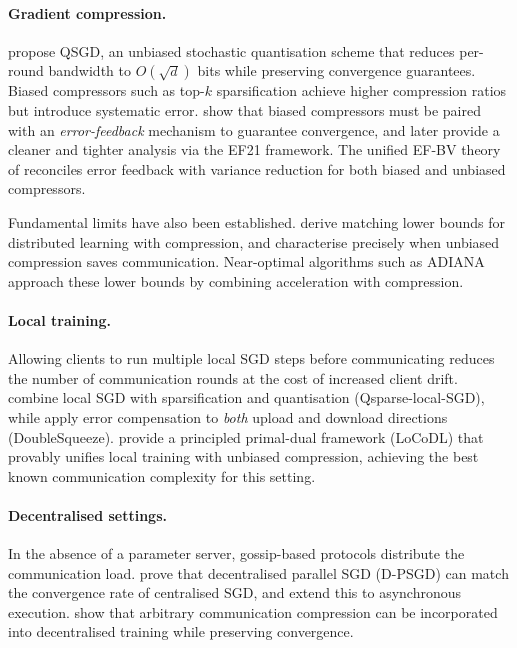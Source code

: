 \paragraph{Gradient compression.}
\citet{alistarh2017qsgd} propose QSGD, an unbiased stochastic
quantisation scheme that reduces per-round bandwidth to
$O(\sqrt{d})$ bits while preserving convergence guarantees.
Biased compressors such as top-$k$ sparsification achieve higher
compression ratios but introduce systematic error.
\citet{karimireddy2019error} show that biased compressors must be
paired with an \emph{error-feedback} mechanism to guarantee
convergence, and \citet{richtarik2021ef21} later provide a cleaner
and tighter analysis via the EF21 framework.  The unified EF-BV
theory of \citet{condat2022efbv} reconciles error feedback with
variance reduction for both biased and unbiased compressors.

Fundamental limits have also been established.
\citet{huang2022lower} derive matching lower bounds for distributed
learning with compression, and \citet{he2023unbiased} characterise
precisely when unbiased compression saves communication.
Near-optimal algorithms such as ADIANA
\citep{li2020acceleration} approach these lower bounds by combining
acceleration with compression.

\paragraph{Local training.}
Allowing clients to run multiple local SGD steps before communicating
reduces the number of communication rounds at the cost of increased
client drift.  \citet{basu2020qsparse} combine local SGD with
sparsification and quantisation (Qsparse-local-SGD), while
\citet{tang2019doublesqueeze} apply error compensation to
\emph{both} upload and download directions (DoubleSqueeze).
\citet{condat2024locodl} provide a principled primal-dual framework
(LoCoDL) that provably unifies local training with unbiased
compression, achieving the best known communication complexity for
this setting.

\paragraph{Decentralised settings.}
In the absence of a parameter server, gossip-based protocols
distribute the communication load.
\citet{lian2017can} prove that decentralised parallel SGD (D-PSGD)
can match the convergence rate of centralised SGD, and
\citet{lian2017async} extend this to asynchronous execution.
\citet{koloskova2019decentralized} show that arbitrary communication
compression can be incorporated into decentralised training while
preserving convergence.

